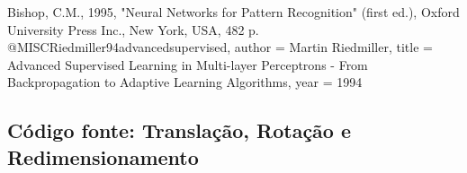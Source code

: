 \documentclass[
	article,			%
	11pt,				%
	oneside,			%
	a4paper,			%
	english,			%
	brazil,				%
	sumario=tradicional
	]{abntex2}
\newcommand{\matlabCodePath}{/home/clifte/git/Mestrado/Matlab/}
\begin{document}
% 


\begin{citacao}

\end{citacao}




Bishop, C.M., 1995, "Neural Networks for Pattern Recognition" (first ed.),
Oxford University Press Inc., New York, USA, 482 p.
 @MISC{Riedmiller94advancedsupervised,
    author = {Martin Riedmiller},
    title = {Advanced Supervised Learning in Multi-layer Perceptrons - From Backpropagation to Adaptive Learning Algorithms},
    year = {1994}
}

 
%
%


\begin{apendicesenv} 

\chapter{Código fonte: Translação, Rotação e Redimensionamento}
\label{apend:transRotRed}

	
 	\lstset{extendedchars=true,inputencoding=utf8/latin1}
 	



\end{apendicesenv}



\end{document}
